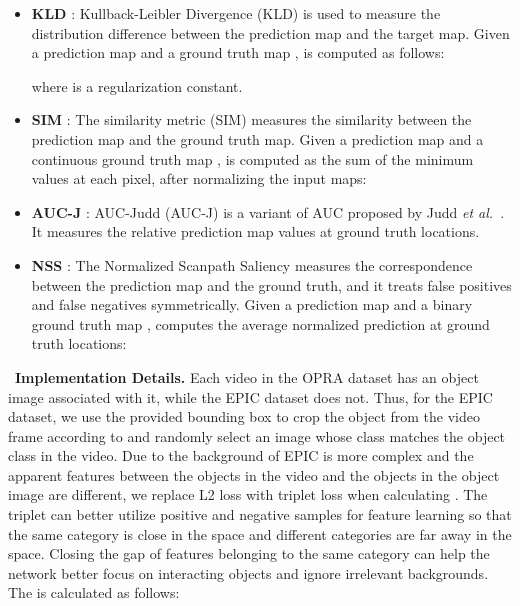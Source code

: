\documentclass[journal,twoside]{IEEEtran}
\newcommand{\myPara}[1]{\vspace{5pt}\noindent~\textbf{#1} \quad}
\def\etal{{\em et al.~}}
\begin{document}
\begin{itemize}

\item []
\textbf{KLD }\cite{bylinskii2018different}: Kullback-Leibler Divergence (KLD) is used to measure the distribution difference between the prediction map and the target map. Given a prediction map  and a ground truth map ,  is computed as follows:

where  is a regularization constant.

\item []
\textbf{SIM }\cite{swain1991color}: The similarity metric (SIM) measures the similarity between the prediction map and the ground truth map. Given a prediction map  and a continuous ground truth map ,  is computed as the sum of the minimum values at each pixel, after normalizing the input maps:


\item []
\textbf{AUC-J }\cite{DBLP:conf/iccv/JuddEDT09}: AUC-Judd (AUC-J) is a variant of AUC proposed by Judd \etal \cite{DBLP:conf/iccv/JuddEDT09}. It measures the relative prediction map values at ground truth locations.

\item []
\textbf{NSS }\cite{peters2005components}: The Normalized Scanpath Saliency measures the correspondence between the prediction map and the ground truth, and it treats false positives and false negatives symmetrically. Given a prediction map  and a binary ground truth map ,  computes the average normalized prediction at ground truth locations:


\end{itemize}

\myPara{Implementation Details.}
Each video in the OPRA \cite{demo2vec2018cvpr} dataset has an object image associated with it, while the EPIC \cite{Damen2018EPICKITCHENS} dataset does not. Thus, for the EPIC dataset, we use the provided bounding box to crop the object from the video frame according to \cite{interaction-hotspots} and randomly select an image whose class matches the object class in the video. Due to the background of EPIC is more complex and the apparent features between the objects in the video and the objects in the object image are different, we replace L2 loss with triplet loss when calculating . The triplet can better utilize positive and negative samples for feature learning so that the same category is close in the space and different categories are far away in the space. Closing the gap of features belonging to the same category can help the network better focus on interacting objects and ignore irrelevant backgrounds. The  is calculated as follows:
\end{document}
